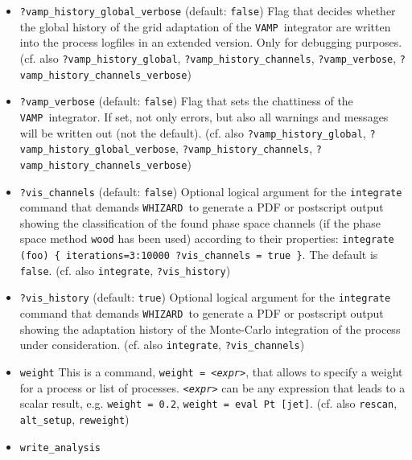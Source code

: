 \documentclass[12pt]{book}
\newcommand{\ttt}[1]{\texttt{#1}}
\newcommand{\whizard}{\texttt{WHIZARD}}
\newcommand{\vamp}{\texttt{VAMP}}
\begin{document}
\begin{itemize}
\ttt{?vamp\_history\_channels},
\ttt{?vamp\_history\_channels\_verbose}, \ttt{?vamp\_verbose}) 
\item
\ttt{?vamp\_history\_global\_verbose} \qquad (default: \ttt{false})
\newline 
Flag that decides whether the global history of the grid adaptation of
the \vamp\ integrator are written into the process logfiles in an
extended version. Only for debugging purposes.
(cf. also \ttt{?vamp\_history\_global},
\ttt{?vamp\_history\_channels}, \ttt{?vamp\_verbose},
\ttt{?vamp\_history\_channels\_verbose}) 
\item
\ttt{?vamp\_verbose} \qquad (default: \ttt{false}) \newline
Flag that sets the chattiness of the \vamp\ integrator. If set, not
only errors, but also all warnings and messages will be written out
(not the default). (cf. also \newline \ttt{?vamp\_history\_global},
\ttt{?vamp\_history\_global\_verbose}, \ttt{?vamp\_history\_channels},
\newline \ttt{?vamp\_history\_channels\_verbose})
\item
\ttt{?vis\_channels} \qquad (default: \ttt{false}) \newline
Optional logical argument for the \ttt{integrate} command that demands
\whizard\ to generate a PDF or postscript output showing the
classification of the found phase space channels (if the phase space
method \ttt{wood} has been used) according to their
properties: \ttt{integrate (foo) \{ iterations=3:10000 ?vis\_channels
= true \}}. The default is \ttt{false}. 
(cf. also \ttt{integrate}, \ttt{?vis\_history})
\item
\ttt{?vis\_history} \qquad (default: \ttt{true}) \newline
Optional logical argument for the \ttt{integrate} command that demands
\whizard\ to generate a PDF or postscript output showing the
adaptation history of the Monte-Carlo integration of the process under
consideration. (cf. also \ttt{integrate}, \ttt{?vis\_channels})
\item
\ttt{weight} \newline
This is a command, \ttt{weight = {\em <expr>}}, that allows to specify a
weight for a process or list of processes. \ttt{{\em <expr>}} can be
any expression that leads to a scalar result, e.g. \ttt{weight = 0.2},
\ttt{weight = eval Pt [jet]}.  (cf. also \ttt{rescan},
\ttt{alt\_setup}, \ttt{reweight})
\item
\ttt{write\_analysis} \newline

\end{itemize}
\end{document}
